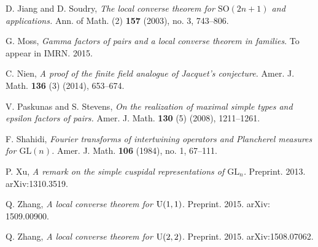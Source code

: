 \documentclass[12pt]{amsart}
\begin{document}
\begin{thebibliography}{}
D. Jiang and D. Soudry, 
{\it The local converse theorem for ${{\mathrm{SO}}}(2n+1)$ and applications.}
Ann. of Math. (2) \textbf{157} (2003), no. 3, 743--806.

G. Moss,
{\it Gamma factors of pairs and a local converse theorem in families}. 
To appear in IMRN. 2015.

C. Nien,
{\it A proof of the finite field analogue of Jacquet's conjecture.} 
Amer. J. Math. \textbf{136} (3) (2014), 653--674.
 
V. Paskunas and S. Stevens,
{\it On the realization of maximal simple types and epsilon factors of pairs.}
Amer. J. Math. \textbf{130} (5) (2008), 1211--1261.
 

F. Shahidi,
{\it Fourier transforms of intertwining operators and Plancherel measures for ${{\mathrm{GL}}}(n)$.}
Amer. J. Math. \textbf{106} (1984), no. 1, 67--111.

P. Xu,
{\it A remark on the simple cuspidal representations of ${{\mathrm{GL}}}_n$.}
Preprint. 2013. arXiv:1310.3519.

Q. Zhang, 
{\it A local converse theorem for ${\rm U}(1,1)$}. 
Preprint. 2015. arXiv: 1509.00900.

Q. Zhang, 
{\it A local converse theorem for ${\rm U}(2,2)$}. 
Preprint. 2015.  arXiv:1508.07062.
\end{thebibliography}
\end{document}
